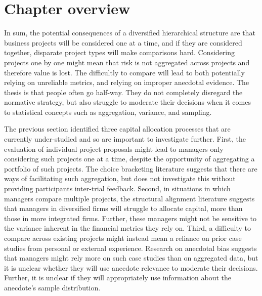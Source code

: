 \documentclass[a4paper, nobind, dvipsnames]{templates/ociamthesis}
\theoremstyle{definition}
\theoremstyle{definition}
\theoremstyle{definition}
\theoremstyle{definition}
\theoremstyle{remark}
\begin{document}
\hypertarget{chapter-overview}{%
\section{Chapter overview}\label{chapter-overview}}

In sum, the potential consequences of a diversified hierarchical structure are
that business projects will be considered one at a time, and if they are
considered together, disparate project types will make comparisons hard.
Considering projects one by one might mean that risk is not aggregated across
projects and therefore value is lost. The difficultly to compare will lead to
both potentially relying on unreliable metrics, and relying on improper
anecdotal evidence. The thesis is that people often go half-way. They do not
completely disregard the normative strategy, but also struggle to moderate their
decisions when it comes to statistical concepts such as aggregation, variance,
and sampling.

The previous section identified three capital allocation processes that are
currently under-studied and so are important to investigate further. First, the
evaluation of individual project proposals might lead to managers only
considering such projects one at a time, despite the opportunity of aggregating
a portfolio of such projects. The choice bracketing literature suggests that
there are ways of facilitating such aggregation, but does not investigate this
without providing participants inter-trial feedback. Second, in situations in
which managers compare multiple projects, the structural alignment literature
suggests that managers in diversified firms will struggle to allocate capital,
more than those in more integrated firms. Further, these managers might not be
sensitive to the variance inherent in the financial metrics they rely on. Third,
a difficulty to compare across existing projects might instead mean a reliance
on prior case studies from personal or external experience. Research on
anecdotal bias suggests that managers might rely more on such case studies than
on aggregated data, but it is unclear whether they will use anecdote relevance
to moderate their decisions. Further, it is unclear if they will appropriately
use information about the anecdote's sample distribution.
\end{document}
